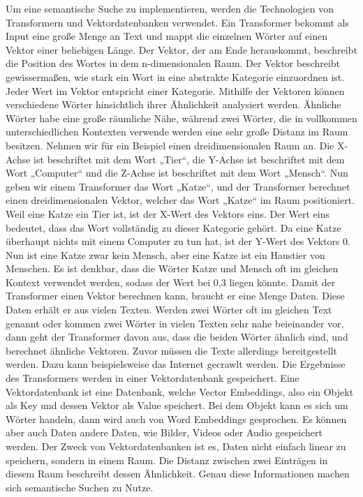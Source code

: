 Um eine semantische Suche zu implementieren, werden die Technologien von Transformern und Vektordatenbanken verwendet.
Ein Transformer bekommt als Input eine große Menge an Text und mappt die einzelnen Wörter auf einen Vektor einer beliebigen Länge.
Der Vektor, der am Ende herauskommt, beschreibt die Position des Wortes in dem n-dimensionalen Raum.
Der Vektor beschreibt gewissermaßen, wie stark ein Wort in eine abstrakte Kategorie einzuordnen ist.
Jeder Wert im Vektor entspricht einer Kategorie.
Mithilfe der Vektoren können verschiedene Wörter hinsichtlich ihrer Ähnlichkeit analysiert werden.
Ähnliche Wörter habe eine große räumliche Nähe, während zwei Wörter, die in vollkommen unterschiedlichen Kontexten verwende werden eine sehr große Distanz im Raum besitzen.
Nehmen wir für ein Beispiel einen dreidimensionalen Raum an.
Die X-Achse ist beschriftet mit dem Wort „Tier“, die Y-Achse ist beschriftet mit dem Wort „Computer“ und die Z-Achse ist beschriftet mit dem Wort „Mensch“.
Nun geben wir einem Transformer das Wort „Katze“, und der Transformer berechnet einen dreidimensionalen Vektor, welcher das Wort „Katze“ im Raum positioniert.
Weil eine Katze ein Tier ist, ist der X-Wert des Vektors eins.
 Der Wert eins bedeutet, dass das Wort vollständig zu dieser Kategorie gehört.
Da eine Katze überhaupt nichts mit einem Computer zu tun hat, ist der Y-Wert des Vektors 0.
Nun ist eine Katze zwar kein Mensch, aber eine Katze ist ein Haustier von Menschen.
Es ist denkbar, dass die Wörter Katze und Mensch oft im gleichen Kontext verwendet werden, sodass der Wert bei 0,3 liegen könnte.
Damit der Transformer einen Vektor berechnen kann, braucht er eine Menge Daten.
Diese Daten erhält er aus vielen Texten.
Werden zwei Wörter oft im gleichen Text genannt oder kommen zwei Wörter in vielen Texten sehr nahe beieinander vor, dann geht der Transformer davon aus, dass die beiden Wörter ähnlich sind, und berechnet ähnliche Vektoren.
Zuvor müssen die Texte allerdings bereitgestellt werden.
Dazu kann beispielsweise das Internet gecrawlt werden.
Die Ergebnisse des Transformers werden in einer Vektordatenbank gespeichert.
Eine Vektordatenbank ist eine Datenbank, welche Vector Embeddings, also ein Objekt als Key und dessen Vektor als Value speichert.
Bei dem Objekt kann es sich um Wörter handeln, dann wird auch von Word Embeddings gesprochen.
Es können aber auch Daten andere Daten, wie Bilder, Videos oder Audio gespeichert werden.
Der Zweck von Vektordatenbanken ist es, Daten nicht einfach linear zu speichern, sondern in einem Raum.
Die Distanz zwischen zwei Einträgen in diesem Raum beschreibt dessen Ähnlichkeit.
Genau diese Informationen machen sich semantische Suchen zu Nutze.

